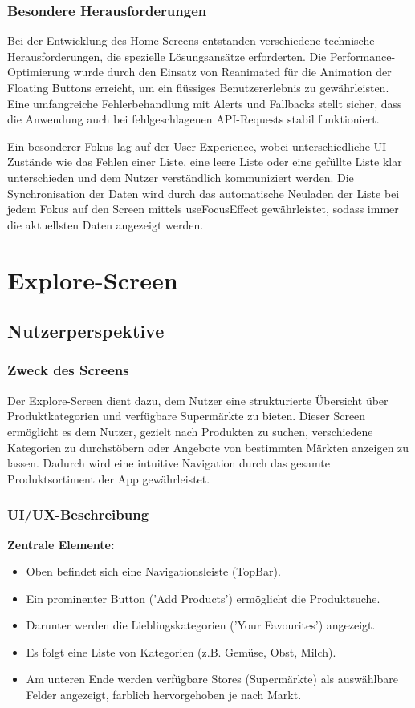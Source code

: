\documentclass[12pt, a4paper]{report} %
\begin{document}
\subsubsection{Besondere Herausforderungen}
Bei der Entwicklung des Home-Screens entstanden verschiedene technische Herausforderungen, die spezielle Lösungsansätze erforderten. Die Performance-Optimierung wurde durch den Einsatz von Reanimated für die Animation der Floating Buttons erreicht, um ein flüssiges Benutzererlebnis zu gewährleisten. Eine umfangreiche Fehlerbehandlung mit Alerts und Fallbacks stellt sicher, dass die Anwendung auch bei fehlgeschlagenen API-Requests stabil funktioniert.

Ein besonderer Fokus lag auf der User Experience, wobei unterschiedliche UI-Zustände wie das Fehlen einer Liste, eine leere Liste oder eine gefüllte Liste klar unterschieden und dem Nutzer verständlich kommuniziert werden. Die Synchronisation der Daten wird durch das automatische Neuladen der Liste bei jedem Fokus auf den Screen mittels useFocusEffect gewährleistet, sodass immer die aktuellsten Daten angezeigt werden.

\section{Explore-Screen}
\label{sec:explore_screen}

\subsection{Nutzerperspektive}

\subsubsection{Zweck des Screens}
Der Explore-Screen dient dazu, dem Nutzer eine strukturierte Übersicht über Produktkategorien und verfügbare Supermärkte zu bieten. Dieser Screen ermöglicht es dem Nutzer, gezielt nach Produkten zu suchen, verschiedene Kategorien zu durchstöbern oder Angebote von bestimmten Märkten anzeigen zu lassen. Dadurch wird eine intuitive Navigation durch das gesamte Produktsortiment der App gewährleistet.

\subsubsection{UI/UX-Beschreibung}

\textbf{Zentrale Elemente:}
\begin{itemize}
    \item Oben befindet sich eine Navigationsleiste (TopBar).
    \item Ein prominenter Button ('Add Products') ermöglicht die Produktsuche.
    \item Darunter werden die Lieblingskategorien ('Your Favourites') angezeigt.
    \item Es folgt eine Liste von Kategorien (z.B. Gemüse, Obst, Milch).
    \item Am unteren Ende werden verfügbare Stores (Supermärkte) als auswählbare Felder angezeigt, farblich hervorgehoben je nach Markt.
\end{itemize}
\end{document}
